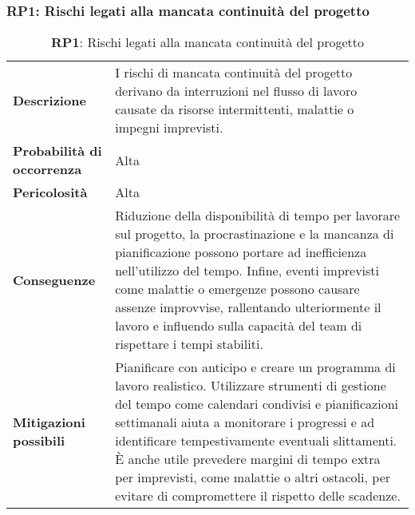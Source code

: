 \subsubsection{RP1: Rischi legati alla mancata continuità del progetto}
\label{sec:Rischi legati alla continuità del progetto}
\begin{table}[h!]
    \centering
    \renewcommand{\arraystretch}{1.5} %
    \begin{tabularx}{\textwidth}{|X|X|}\hline
    \rowcolor[HTML]{FFD700} 
    \multicolumn{2}{|c|}{\textbf{Rischi legati alla mancata continuità del progetto}} \\ \hline
    \textbf{Descrizione} & I rischi di mancata continuità del progetto derivano da interruzioni nel flusso di lavoro causate da risorse intermittenti, malattie o impegni imprevisti.\\ \hline
    \textbf{Probabilità di occorrenza} & Alta \\ \hline
    \textbf{Pericolosità} & Alta \\ \hline
    \textbf{Conseguenze} & Riduzione della disponibilità di tempo per lavorare sul progetto, la procrastinazione e la mancanza di pianificazione possono portare ad inefficienza nell’utilizzo del tempo. Infine, eventi imprevisti come malattie o emergenze possono causare assenze improvvise, rallentando ulteriormente il lavoro e 
    influendo sulla capacità del team di rispettare i tempi stabiliti. \\ \hline
    \textbf{Mitigazioni possibili} & Pianificare con anticipo e creare un programma di lavoro realistico. Utilizzare strumenti di gestione del tempo come calendari condivisi e pianificazioni settimanali 
    aiuta a monitorare i progressi e ad identificare tempestivamente eventuali slittamenti. È anche utile prevedere margini di tempo extra per imprevisti, come malattie o altri ostacoli, per evitare di compromettere il rispetto delle scadenze.\\ \hline
    \end{tabularx}
    \caption{\textbf{RP1}: Rischi legati alla mancata continuità del progetto}
    \end{table}

\newpage

